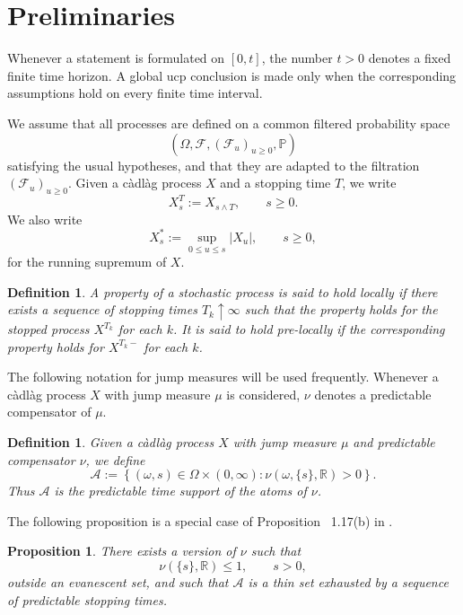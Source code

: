 \documentclass[a4paper,10pt]{article}
\newtheorem{prop}[thm]{Proposition}
\newtheorem{defin}[thm]{Definition}
\begin{document}
\section{Preliminaries}\label{sec:preliminaries}

Whenever a statement is formulated on \([0,t]\), the number \(t>0\)
denotes a fixed finite time horizon. A global ucp conclusion is made
only when the corresponding assumptions hold on every finite time
interval.

We assume that all processes are defined on a common filtered
probability space
\[
        (\Omega,\mathcal F,(\mathcal F_u)_{u\ge0},\mathbb P)
\]
satisfying the usual hypotheses, and that they are adapted to the
filtration \((\mathcal F_u)_{u\ge0}\). Given a càdlàg process \(X\)
and a stopping time \(T\), we write
\[
        X^T_s:=X_{s\wedge T},
        \qquad s\ge0.
\]
We also write
\[
        X^*_s:=\sup_{0\le u\le s}|X_u|,
        \qquad s\ge0,
\]
for the running supremum of \(X\).

\begin{defin}\label{loc}
A property of a stochastic process is said to hold locally if there exists a
sequence of stopping times \(T_k\uparrow\infty\) such that the property holds
for the stopped process \(X^{T_k}\) for each \(k\). It is said to hold
pre-locally if the corresponding property holds for \(X^{T_k-}\) for each
\(k\).
\end{defin}


The following notation for jump measures will be used frequently. Whenever a
càdlàg process \(X\) with jump measure \(\mu\) is considered, \(\nu\) denotes
a predictable compensator of \(\mu\).

\begin{defin}\label{calA}
Given a càdlàg process \(X\) with jump measure \(\mu\) and predictable
compensator \(\nu\), we define
\[
\mathcal A
:=
\left\{
(\omega,s)\in\Omega\times(0,\infty):
\nu(\omega,\{s\},\mathbb R)>0
\right\}.
\]
Thus \(\mathcal A\) is the predictable time support of the atoms of
\(\nu\).
\end{defin}




The following proposition is a special case of Proposition ~1.17(b) in
\cite{JacodShiryaev}.

\begin{prop}
There exists a version of \(\nu\) such that
\[
        \nu(\{s\},\mathbb R)\leq1,
        \qquad s>0,
\]
outside an evanescent set, and such that \(\mathcal A\) is a thin set
exhausted by a sequence of predictable stopping times.
\end{prop}
\end{document}
